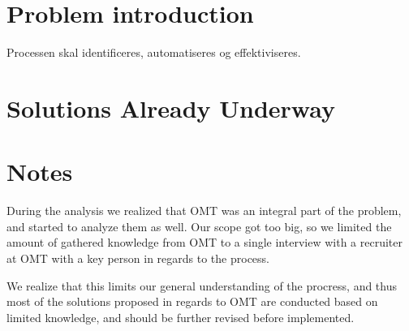 \section{Problem introduction}

Processen skal identificeres, automatiseres og effektiviseres.

\section{Solutions Already Underway}


\section{Notes}
During the analysis we realized that OMT was an integral part of the problem, and started to analyze them as well. Our scope got too big, so we limited the amount of gathered knowledge from OMT to a single interview with a recruiter at OMT with a key person in regards to the process. 

We realize that this limits our general understanding of the procress, and thus most of the solutions proposed in regards to OMT are conducted based on limited knowledge, and should be further revised before implemented. 
